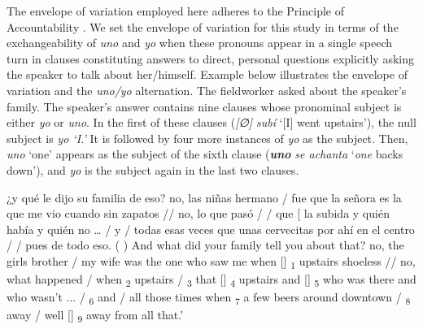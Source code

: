 \documentclass[output=paper]{langscibook}
\begin{document}
The envelope of variation employed here adheres to the Principle of Accountability \citep[72]{Labov1972}. We set the envelope of variation for this study in terms of the exchangeability of \textit{uno} and \textit{yo} when these pronouns appear in a single speech turn in clauses constituting answers to direct, personal questions explicitly asking the speaker to talk about her/himself. Example  below illustrates the envelope of variation and the \textit{uno/yo} alternation. The fieldworker asked about the speaker’s family. The speaker’s answer contains nine clauses whose pronominal subject is either \textit{yo} or \textit{uno}. In the first of these clauses (\textit{[∅] subí} ‘[I] went upstairs’), the null subject is \textit{yo ‘I.’} It is followed by four more instances of \textit{yo} as the subject. Then, \textit{uno} ‘one’ appears as the subject of the sixth clause (\textbf{\textit{uno}} \textit{se achanta} ‘\textit{one} backs down’), and \textit{yo} is the subject again in the last two clauses.

\eanoraggedright\label{ex:orozco:9}
 \begin{xlist}[‘E.:]
  ¿y qué le dijo su familia de eso?
 {no, las niñas hermano / fue que la señora es la que me vio cuando}  {sin zapatos // no, lo que pasó /}  {/}  {que [}\ExHighlight{{ø]} \ExHighlight{subí}}{\textsubscript{4}} {la subida y}  {quién había y quién no …}  {/}  {y / todas esas veces que}  {unas cervecitas por ahí en el centro /}  {/ pues}  {de todo eso}. ( ) 
 And what did your family tell you about that?
 no, the girls brother / my wife was the one who saw me when [] \textsubscript{1} upstairs shoeless // no, what happened / when  \textsubscript{2} upstairs /  \textsubscript{3} that [] \textsubscript{4} upstairs and []  \textsubscript{5} who was there and who wasn’t ...  /   \textsubscript{6} and / all those times when  \textsubscript{7} a few beers around downtown /  \textsubscript{8} away / well []  \textsubscript{9} away from all that.’ 
\end{xlist}
\z 
\end{document}

